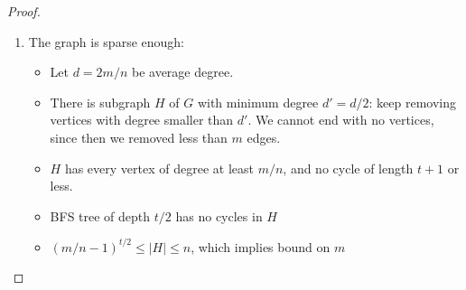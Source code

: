 \documentclass[11pt]{article}
\begin{document}
\begin{proof}
\begin{enumerate}
\begin{proof}
\begin{itemize}
		\item As we now have a counterexample where $|P_G|=1$ and $|P_H|>t|P_G|=t$, we arrive at a contradiction: when we were processing the only edge on $P_G$, we should have added it to $H$ as it didn't cause a cycle of length $\leq t+1$ - it doesn't cause that now as $d_H(u,v) = |P_H| \geq t+1$ and in the time of processing of that edge it also didn't as $H$ at that time was a subgraph of the final $H$.
	\end{itemize}
\end{proof}
\item The graph is sparse enough:
\begin{itemize}
\item Let $d = 2m/n$ be average degree.
\item There is subgraph $H$ of $G$ with minimum degree $d' = d/2$: keep removing vertices with degree smaller than $d'$. We cannot end with no vertices, since then we removed less than $m$ edges.
\item $H$ has every vertex of degree at least $m/n$, and no cycle of length $t+1$ or less.
\item BFS tree of depth $t/2$ has no cycles in $H$
\item $(m/n-1)^{t/2} \le |H| \le n$, which implies bound on $m$
\end{itemize}
\end{enumerate}
\end{proof}



\end{document}
